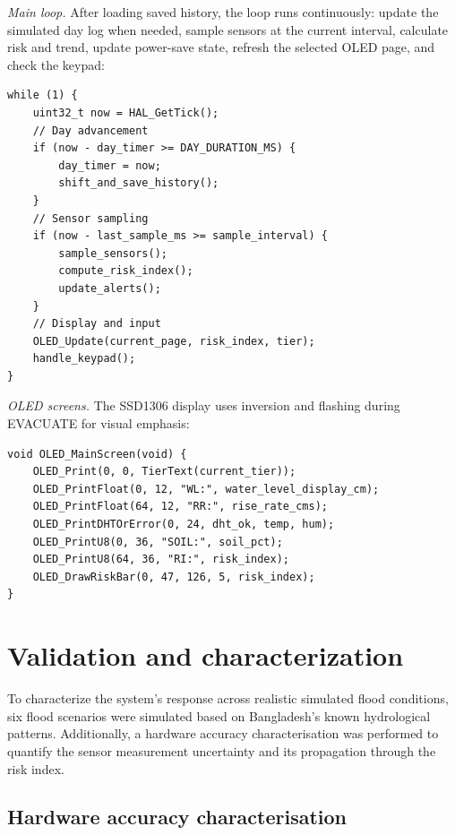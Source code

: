 \documentclass[5p,twocolumn]{elsarticle}
\begin{document}
\textit{Main loop.} After loading saved history, the loop runs continuously: update the simulated day log when needed, sample sensors at the current interval, calculate risk and trend, update power-save state, refresh the selected OLED page, and check the keypad:

\begin{lstlisting}
while (1) {
    uint32_t now = HAL_GetTick();
    // Day advancement
    if (now - day_timer >= DAY_DURATION_MS) {
        day_timer = now;
        shift_and_save_history();
    }
    // Sensor sampling
    if (now - last_sample_ms >= sample_interval) {
        sample_sensors();
        compute_risk_index();
        update_alerts();
    }
    // Display and input
    OLED_Update(current_page, risk_index, tier);
    handle_keypad();
}
\end{lstlisting}

\textit{OLED screens.} The SSD1306 display uses inversion and flashing during EVACUATE for visual emphasis:

\begin{lstlisting}
void OLED_MainScreen(void) {
    OLED_Print(0, 0, TierText(current_tier));
    OLED_PrintFloat(0, 12, "WL:", water_level_display_cm);
    OLED_PrintFloat(64, 12, "RR:", rise_rate_cms);
    OLED_PrintDHTOrError(0, 24, dht_ok, temp, hum);
    OLED_PrintU8(0, 36, "SOIL:", soil_pct);
    OLED_PrintU8(64, 36, "RI:", risk_index);
    OLED_DrawRiskBar(0, 47, 126, 5, risk_index);
}
\end{lstlisting}


\section{Validation and characterization}

To characterize the system's response across realistic simulated flood conditions, six flood scenarios were simulated based on Bangladesh's known hydrological patterns. Additionally, a hardware accuracy characterisation was performed to quantify the sensor measurement uncertainty and its propagation through the risk index.

\subsection{Hardware accuracy characterisation}
\end{document}
